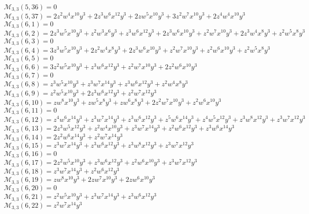 \documentclass[12pt]{memoireuqam1.3}
\begin{document}
$\mathcal{M}_{3,3}(5,36)=0$\\
$\mathcal{M}_{3,3}(5,37)=2z^2w^4x^{10}y^3+2z^3w^6x^{12}y^3+2zw^5x^{10}y^3+3z^2w^7x^{10}y^3+2z^4w^4x^{10}y^3$\\
$\mathcal{M}_{3,3}(6,1)=0$\\
$\mathcal{M}_{3,3}(6,2)=2z^3w^5x^{10}y^3+z^2w^3x^6y^3+z^3w^6x^{12}y^3+2z^3w^6x^{10}y^3+z^2w^7x^{10}y^3+2z^3w^4x^8y^3+z^2w^5x^8y^3$\\
$\mathcal{M}_{3,3}(6,3)=0$\\
$\mathcal{M}_{3,3}(6,4)=3z^3w^5x^{10}y^3+2z^2w^4x^8y^3+2z^3w^6x^{10}y^3+z^2w^7x^{10}y^3+z^2w^6x^{10}y^3+z^2w^5x^8y^3$\\
$\mathcal{M}_{3,3}(6,5)=0$\\
$\mathcal{M}_{3,3}(6,6)=3z^2w^5x^{10}y^3+z^3w^6x^{12}y^3+z^2w^7x^{10}y^3+2z^2w^6x^{10}y^3$\\
$\mathcal{M}_{3,3}(6,7)=0$\\
$\mathcal{M}_{3,3}(6,8)=z^3w^5x^{10}y^3+z^3w^7x^{14}y^3+z^3w^6x^{12}y^3+z^2w^4x^8y^3$\\
$\mathcal{M}_{3,3}(6,9)=z^2w^5x^{10}y^3+2z^3w^6x^{12}y^3+z^2w^7x^{12}y^3$\\
$\mathcal{M}_{3,3}(6,10)=zw^8x^{10}y^3+zw^5x^8y^3+zw^6x^8y^3+2z^2w^7x^{10}y^3+z^2w^6x^{10}y^3$\\
$\mathcal{M}_{3,3}(6,11)=0$\\
$\mathcal{M}_{3,3}(6,12)=z^4w^6x^{14}y^3+z^3w^7x^{14}y^3+z^3w^6x^{12}y^3+z^5w^6x^{14}y^3+z^4w^5x^{12}y^3+z^3w^8x^{12}y^3+z^3w^7x^{12}y^3$\\
$\mathcal{M}_{3,3}(6,13)=2z^3w^5x^{12}y^3+z^2w^4x^{10}y^3+z^3w^7x^{14}y^3+z^2w^6x^{12}y^3+z^3w^6x^{14}y^3$\\
$\mathcal{M}_{3,3}(6,14)=2z^2w^6x^{14}y^3+z^2w^7x^{14}y^3$\\
$\mathcal{M}_{3,3}(6,15)=z^3w^7x^{14}y^3+z^3w^6x^{12}y^3+z^3w^8x^{12}y^3+z^3w^7x^{12}y^3$\\
$\mathcal{M}_{3,3}(6,16)=0$\\
$\mathcal{M}_{3,3}(6,17)=2z^2w^5x^{10}y^3+z^3w^6x^{12}y^3+z^2w^6x^{10}y^3+z^3w^7x^{12}y^3$\\
$\mathcal{M}_{3,3}(6,18)=z^3w^7x^{14}y^3+z^2w^6x^{12}y^3$\\
$\mathcal{M}_{3,3}(6,19)=zw^8x^{10}y^3+2zw^7x^{10}y^3+2zw^6x^{10}y^3$\\
$\mathcal{M}_{3,3}(6,20)=0$\\
$\mathcal{M}_{3,3}(6,21)=z^2w^5x^{10}y^3+z^3w^7x^{14}y^3+z^3w^6x^{12}y^3$\\
$\mathcal{M}_{3,3}(6,22)=z^2w^7x^{14}y^3$\\
\end{document}
